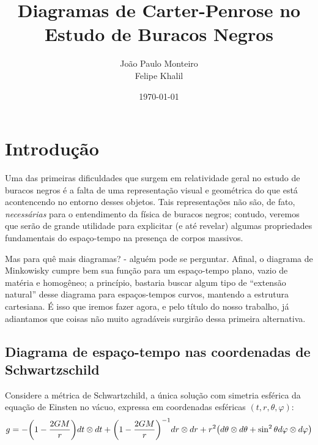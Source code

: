 \documentclass[12pt, a4paper]{article}
\theoremstyle{meuremarkstyle}
\theoremstyle{definicao}
\begin{document}
\title{Diagramas de Carter-Penrose no Estudo de Buracos Negros}


\author{João Paulo Monteiro\\ Felipe Khalil}

\date{\today}

\maketitle
\tableofcontents

\newpage %

\setcounter{page}{1}
\section{Introdução}

Uma das primeiras dificuldades que surgem em relatividade geral no estudo de buracos negros
 é a falta de uma representação visual e geométrica do que está acontencendo no entorno
desses objetos. Tais representações não são, de fato, \textit{necessárias} para o 
entendimento da física de buracos negros; contudo, veremos que serão de grande utilidade para explicitar
(e até revelar) algumas propriedades fundamentais do espaço-tempo na presença de corpos massivos.

Mas para quê mais diagramas? - alguém pode se perguntar. Afinal, o diagrama de Minkowisky cumpre bem sua função para um espaço-tempo plano, vazio de matéria e homogêneo; a princípio,
bastaria buscar algum tipo de \enquote{extensão natural} desse diagrama para espaços-tempos curvos, mantendo a estrutura cartesiana.
É isso que iremos fazer agora, e pelo título do nosso trabalho, já adiantamos que coisas
não muito agradáveis surgirão dessa primeira alternativa.

\subsection{Diagrama de espaço-tempo nas coordenadas de Schwartzschild}
Considere a métrica de Schwartzchild, a única solução com simetria esférica da
equação de Einsten no vácuo, expressa em coordenadas esféricas $(t,r,\theta,\varphi)$:
\begin{equation*}
  g = -\qty(1-\frac{2GM}{r})dt\otimes dt + \qty(1-\frac{2GM}{r})^{-1}dr\otimes dr + r^2\qty(d\theta \otimes d\theta + \sin^2\theta d\varphi \otimes d\varphi)
\end{equation*}
\end{document}
